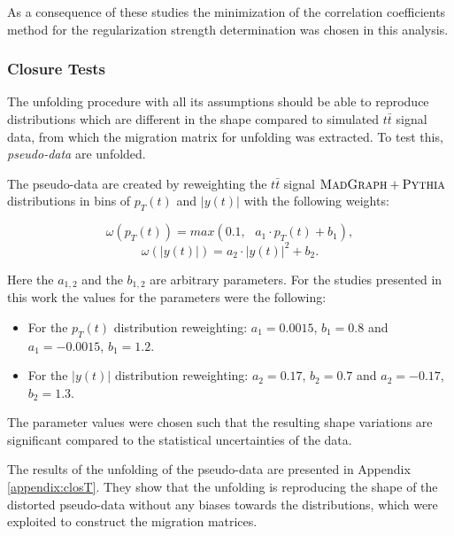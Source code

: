 \begin{itemize}
\end{itemize}

As a consequence of these studies the minimization of the correlation coefficients method for the regularization strength determination was chosen
in this analysis.

\subsubsection{Closure Tests}\label{ssec:clT}

The unfolding procedure with all its assumptions should be able to reproduce distributions which are different in the shape compared to simulated $t\bar{t}$ 
signal data, from which the migration matrix for unfolding was extracted. To test this, \textit{pseudo-data} are unfolded.

The pseudo-data are created by reweighting the $t\bar{t}$ signal $\textsc{MadGraph}+\textsc{Pythia}$ distributions in bins of $p_{T}(t)$ and $|y(t)|$ with the following
weights:

\begin{equation}\label{eq:clTw1}
 \omega(p_{T}(t)) = max(0.1,\:\:\:a_{1} \cdot p_{T}(t) + b_{1}),
\end{equation}
\begin{equation}\label{eq:clTw2}
 \omega(|y(t)|) = a_{2} \cdot |y(t)|^{2} + b_{2}.
\end{equation}

Here the $a_{1,2}$ and the $b_{1,2}$ are arbitrary parameters. For the studies presented in this work the values for the parameters were the 
following: 
\begin{itemize}
 \item For the $p_{T}(t)$ distribution reweighting: $a_{1} = 0.0015$, $b_{1} = 0.8$ and $a_{1} = -0.0015$, $b_{1} = 1.2$. 
 \item For the $|y(t)|$ distribution reweighting: $a_{2} = 0.17$, $b_{2} = 0.7$ and $a_{2} = -0.17$, $b_{2} = 1.3$.
\end{itemize}

The parameter values were chosen such that the resulting shape variations are significant compared to the statistical uncertainties of the 
data.

The results of the unfolding of the pseudo-data are presented in Appendix \ref{appendix:closT}. They show that the unfolding is reproducing
the shape of the distorted pseudo-data without any biases towards the distributions, which were exploited to construct the migration matrices.

